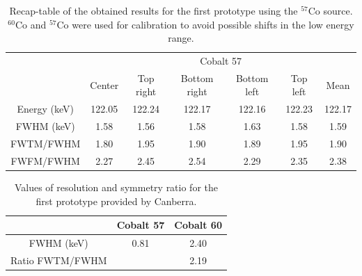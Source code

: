 \documentclass[11pt,a4paper]{article}
\begin{document}
\begin{table}[!h]
\centering
\caption{Recap-table of the obtained results for the first prototype using the $^{57}$Co source. $^{60}$Co and $^{57}$Co were used for calibration to avoid possible shifts in the low energy range.}
\label{recap57}
\begin{tabular}{c|c|c|c|c|c|c|}
\cline{2-7}
                                   & \multicolumn{6}{c|}{Cobalt 57}                                      \\ \cline{2-7} 
                                   & Center & Top right & Bottom right & Bottom left & Top left & Mean   \\ \hline
\multicolumn{1}{|c|}{Energy (keV)} & 122.05 & 122.24    & 122.17       & 122.16      & 122.23   & 122.17 \\ \hline
\multicolumn{1}{|c|}{FWHM (keV)}   & 1.58   & 1.56      & 1.58         & 1.63        & 1.58     & 1.59   \\ \hline
\multicolumn{1}{|c|}{FWTM/FWHM}    & 1.80   & 1.95      & 1.90         & 1.89        & 1.95     & 1.90   \\ \hline
\multicolumn{1}{|c|}{FWFM/FWHM}    & 2.27   & 2.45      & 2.54         & 2.29        & 2.35     & 2.38   \\ \hline
\end{tabular}
\end{table}

\begin{table}[!h]
\centering
\caption{Values of resolution and symmetry ratio for the first prototype provided by Canberra.}
\label{can}
\begin{tabular}{c|c|c|}
\cline{2-3}
                                      & Cobalt 57   & Cobalt 60   \\ \hline
\multicolumn{1}{|c|}{FWHM (keV)}      & 0.81 & 2.40 \\ \hline
\multicolumn{1}{|c|}{Ratio FWTM/FWHM} &      & 2.19 \\ \hline
\end{tabular}
\end{table}
\end{document}
